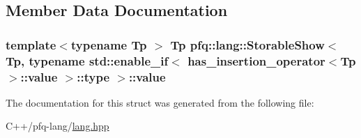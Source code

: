\subsection{Member Data Documentation}
\hypertarget{structpfq_1_1lang_1_1StorableShow_3_01Tp_00_01typename_01std_1_1enable__if_3_01has__insertion__od122cff4f7f007817c88f5b20f967bec_a4c24648cd7accf7e0b1f5c54e4a16636}{
\subsubsection[{value}]{\setlength{\rightskip}{0pt plus 5cm}template$<$typename Tp $>$ Tp {\bf pfq\+::lang\+::\+Storable\+Show}$<$ Tp, typename std\+::enable\+\_\+if$<$ {\bf has\+\_\+insertion\+\_\+operator}$<$Tp $>$\+::value $>$\+::type $>$\+::value}}\label{structpfq_1_1lang_1_1StorableShow_3_01Tp_00_01typename_01std_1_1enable__if_3_01has__insertion__od122cff4f7f007817c88f5b20f967bec_a4c24648cd7accf7e0b1f5c54e4a16636}


The documentation for this struct was generated from the following file\+:\begin{DoxyCompactItemize}
\item 
C++/pfq-\/lang/\hyperlink{lang_8hpp}{lang.\+hpp}\end{DoxyCompactItemize}
